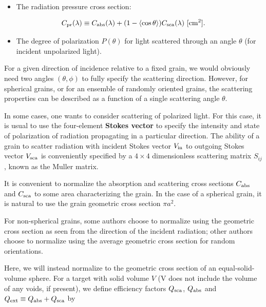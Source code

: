 \documentclass[a4paper,10pt]{article}
\begin{document}
\begin{itemize}
    \item The radiation pressure cross section:
\end{itemize}

\begin{align*}
   C_{\rm pr}(\lambda) \equiv C_{\rm abs}(\lambda) + (1-\langle\cos\theta\rangle)C_{\rm sca}(\lambda) ~ [{\rm cm^2}].
\end{align*}

\begin{itemize}
    \item The degree of polarization $P(\theta)$ for light scattered through an angle $\theta$ (for incident unpolarized light).
\end{itemize}

{\noindent}For a given direction of incidence relative to a fixed grain, we would obviously need two angles $(\theta,\phi)$ to fully specify the scattering direction. However, for spherical grains, or for an ensemble of randomly oriented grains, the scattering properties can be described as a function of a single scattering angle $\theta$.

{\noindent}In some cases, one wants to consider scattering of polarized light. For this case, it is usual to use the four-element \textbf{Stokes vector} to specify the intensity and state of polarization of radiation propagating in a particular direction. The ability of a grain to scatter radiation with incident Stokes vector $V_{\rm in}$ to outgoing Stokes vector $V_{\rm sca}$ is conveniently specified by a $4\times4$ dimensionless scattering matrix $S_{ij}$, known as the Muller matrix.

{\noindent}It is convenient to normalize the absorption and scattering cross sections $C_{\rm abs}$ and $C_{\rm sca}$ to some area characterizing the grain. In the case of a spherical grain, it is natural to use the grain geometric cross section $\pi a^2$.

{\noindent}For non-spherical grains, some authors choose to normalize using the geometric cross section as seen from the direction of the incident radiation; other authors choose to normalize using the average geometric cross section for random orientations.

{\noindent}Here, we will instead normalize to the geometric cross section of an equal-solid-volume sphere. For a target with solid volume $V$ (V does not include the volume of any voids, if present), we define efficiency factors $Q_{\rm sca}$, $Q_{\rm abs}$ and $Q_{\rm ext} \equiv Q_{\rm abs} + Q_{\rm sca}$ by
\end{document}
